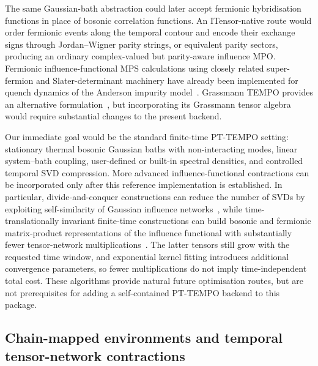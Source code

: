 The same Gaussian-bath abstraction could later accept fermionic hybridisation functions in place of bosonic correlation functions.
An ITensor-native route would order fermionic events along the temporal contour and encode their exchange signs through Jordan--Wigner parity strings, or equivalent parity sectors, producing an ordinary complex-valued but parity-aware influence MPO.
Fermionic influence-functional MPS calculations using closely related super-fermion and Slater-determinant machinery have already been implemented for quench dynamics of the Anderson impurity model~\cite{Park2024FermionicInfluence}.
Grassmann TEMPO provides an alternative formulation~\cite{Chen2024GTEMPO,ChenGuo2024KadanoffBaym}, but incorporating its Grassmann tensor algebra would require substantial changes to the present backend.

Our immediate goal would be the standard finite-time PT-TEMPO setting: stationary thermal bosonic Gaussian baths with non-interacting modes, linear system--bath coupling, user-defined or built-in spectral densities, and controlled temporal SVD compression.
More advanced influence-functional contractions can be incorporated only after this reference implementation is established.
In particular, divide-and-conquer constructions can reduce the number of SVDs by exploiting self-similarity of Gaussian influence networks~\cite{cygorek2024sublinear}, while time-translationally invariant finite-time constructions can build bosonic and fermionic matrix-product representations of the influence functional with substantially fewer tensor-network multiplications~\cite{guo2024influence,SunLiGuo2025TTI}.
The latter tensors still grow with the requested time window, and exponential kernel fitting introduces additional convergence parameters, so fewer multiplications do not imply time-independent total cost.
These algorithms provide natural future optimisation routes, but are not prerequisites for adding a self-contained PT-TEMPO backend to this package.

\subsection{Chain-mapped environments and temporal tensor-network contractions}
\label{subsec:roadmap-chainmapping}

